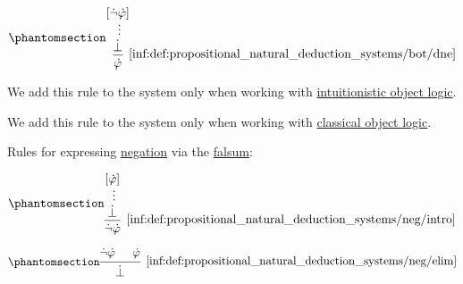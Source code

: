 \begin{definition}
\begin{thmenum}
\begin{paracol}{2}
      \switchcolumn

      \ParacolAlignmentHack
      \begin{equation*}\taglabel[\logic{DNE}]{inf:def:propositional_natural_deduction_systems/bot/dne}
        \begin{prooftree}
          \hypo{ [\synneg \syn\varphi] }
          \ellipsis {} { \synbot }
          \infer1[\ref{inf:def:propositional_natural_deduction_systems/bot/dne}]{ \syn\varphi }
        \end{prooftree}
      \end{equation*}

      \switchcolumn*

      We add this rule to the system only when working with \hyperref[con:intuitionistic_logic]{intuitionistic object logic}.

      \switchcolumn

      We add this rule to the system only when working with \hyperref[con:classical_logic]{classical object logic}.
    \end{paracol}

     Rules for expressing \hyperref[def:propositional_alphabet/negation]{negation} via the \hyperref[def:propositional_alphabet/constants/falsum]{falsum}:
    \begin{paracol}{2}
      \begin{leftcolumn}
        \ParacolAlignmentHack
        \begin{equation*}\taglabel[\ensuremath{ \neg_+ }]{inf:def:propositional_natural_deduction_systems/neg/intro}
          \begin{prooftree}
            \hypo{ [\syn\varphi] }
            \ellipsis {} { \synbot }
            \infer1[\ref{inf:def:propositional_natural_deduction_systems/neg/intro}]{ \synneg \syn\varphi }
          \end{prooftree}
        \end{equation*}
      \end{leftcolumn}

      \begin{rightcolumn}
        \ParacolAlignmentHack
        \begin{equation*}\taglabel[\ensuremath{ \neg_- }]{inf:def:propositional_natural_deduction_systems/neg/elim}
          \begin{prooftree}
            \hypo{ \synneg \syn\varphi }
            \hypo{ \syn\varphi }
            \infer2[\ref{inf:def:propositional_natural_deduction_systems/neg/elim}]{ \synbot }
          \end{prooftree}
        \end{equation*}
      \end{rightcolumn}
    \end{paracol}


\end{thmenum}
\end{definition}
